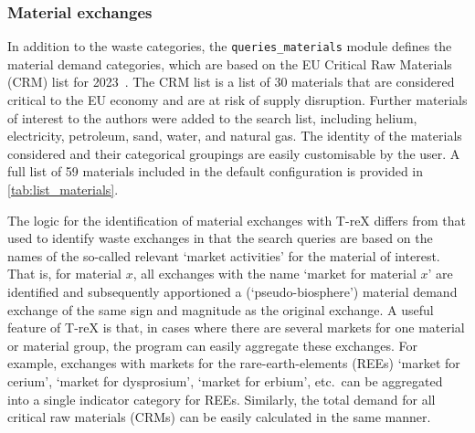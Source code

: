 \documentclass{article}
\renewcommand{\texttt}[1]{{\ttfamily\small\nolinkurl{#1}}}
\begin{document}
\subsubsection{Material exchanges}\label{sec:method-T-reX-material_exchanges}
In addition to the waste categories, the \texttt{queries\_materials} module defines the material demand categories, which are based on the EU Critical Raw Materials (CRM) list for 2023~\citep{eu2023crmstudy}. The CRM list is a list of 30 materials that are considered critical to the EU economy and are at risk of supply disruption. Further materials of interest to the authors were added to the search list, including helium, electricity, petroleum, sand, water, and natural gas. The identity of the materials considered and their categorical groupings are easily customisable by the user. A full list of 59 materials included in the default configuration is provided in \autoref{tab:list_materials}.

The logic for the identification of material exchanges with T-reX differs from that used to identify waste exchanges in that the search queries are based on the names of the so-called relevant `market activities' for the material of interest. That is, for material $x$, all exchanges with the name `market for material $x$' are identified and subsequently apportioned a (`pseudo-biosphere') material demand exchange of the same sign and magnitude as the original exchange. A useful feature of T-reX is that, in cases where there are several markets for one material or material group, the program can easily aggregate these exchanges. For example, exchanges with markets for the rare-earth-elements (REEs) `market for cerium', `market for dysprosium', `market for erbium', etc.\ can be aggregated into a single indicator category for REEs. Similarly, the total demand for all critical raw materials (CRMs) can be easily calculated in the same manner. 
\end{document}
